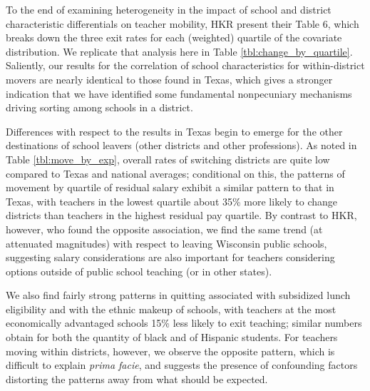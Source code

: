 \documentclass[12pt,]{article}
\begin{document}
To the end of examining heterogeneity in the impact of school and
district characteristic differentials on teacher mobility, HKR present
their Table 6, which breaks down the three exit rates for each
(weighted) quartile of the covariate distribution. We replicate that
analysis here in Table \ref{tbl:change_by_quartile}. Saliently, our
results for the correlation of school characteristics for
within-district movers are nearly identical to those found in Texas,
which gives a stronger indication that we have identified some
fundamental nonpecuniary mechanisms driving sorting among schools in a
district.

Differences with respect to the results in Texas begin to emerge for the
other destinations of school leavers (other districts and other
professions). As noted in Table \ref{tbl:move_by_exp}, overall rates of
switching districts are quite low compared to Texas and national
averages; conditional on this, the patterns of movement by quartile of
residual salary exhibit a similar pattern to that in Texas, with
teachers in the lowest quartile about 35\% more likely to change
districts than teachers in the highest residual pay quartile. By
contrast to HKR, however, who found the opposite association, we find
the same trend (at attenuated magnitudes) with respect to leaving
Wisconsin public schools, suggesting salary considerations are also
important for teachers considering options outside of public school
teaching (or in other states).

We also find fairly strong patterns in quitting associated with
subsidized lunch eligibility and with the ethnic makeup of schools, with
teachers at the most economically advantaged schools 15\% less likely to
exit teaching; similar numbers obtain for both the quantity of black and
of Hispanic students. For teachers moving within districts, however, we
observe the opposite pattern, which is difficult to explain \emph{prima
facie}, and suggests the presence of confounding factors distorting the
patterns away from what should be expected.
\end{document}

